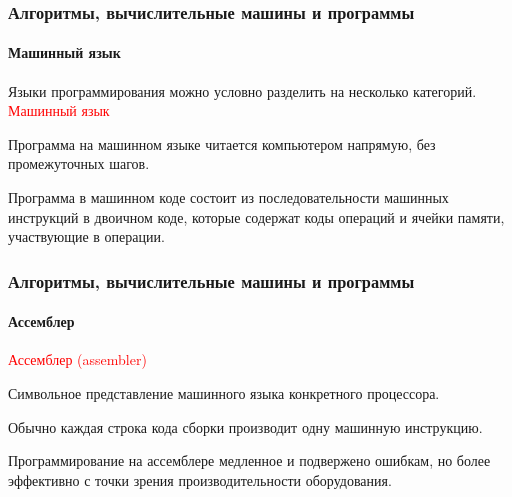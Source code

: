 \documentclass[aspectratio=169]{beamer}
\begin{document}
\begin{frame}
\frametitle{Алгоритмы, вычислительные машины и программы}
\framesubtitle{Машинный язык}
\justifying
\small
Языки программирования можно условно разделить на несколько категорий.\newline\newline
\textcolor{red}{Машинный язык}

Программа на машинном языке читается компьютером напрямую, без промежуточных шагов.\newline

Программа в машинном коде состоит из последовательности машинных инструкций в двоичном коде, которые содержат коды операций и ячейки памяти, участвующие в операции.


\begin{figure}
    \captionsetup[subfigure]{labelformat=empty}
    \centering
\end{figure}
\end{frame}

\begin{frame}
\frametitle{Алгоритмы, вычислительные машины и программы}
\framesubtitle{Ассемблер}
\justifying
\small

\textcolor{red}{Ассемблер (assembler)}

Символьное представление машинного языка конкретного процессора.\newline

Обычно каждая строка кода сборки производит одну машинную инструкцию.\newline

Программирование на ассемблере медленное и подвержено ошибкам, но более эффективно с точки зрения производительности оборудования.

\begin{figure}
    \captionsetup[subfigure]{labelformat=empty}
    \centering
\end{figure}
\end{frame}
\end{document}
